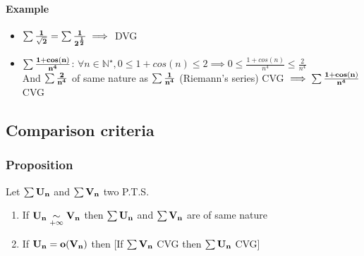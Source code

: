 \documentclass[notitlepage]{math}
\begin{document}
\paragraph{Example}
\begin{itemize}
    \item $\bf \sum \frac{1}{\sqrt{2}} = \sum \frac{1}{2^{\frac{1}{2}}} \implies$ DVG 
    \item $\bf \sum \frac{1 + cos(n)}{n^4}$: $\forall n \in \mathbb{N}^\star, 0 \leq 1 + cos(n) \leq 2 \implies 0 \leq \frac{1 + cos(n)}{n^4} \leq \frac{2}{n^4}$\\
    And $\bf \sum \frac{2}{n^4}$ of same nature as $\bf \sum \frac{1}{n^4}$ (Riemann's series) CVG $\implies \bf \sum \frac{1 + cos(n)}{n^4}$ CVG
\end{itemize}
\subsection{Comparison criteria}
\subsubsection{Proposition}
Let $\bf \sum U_n$ and $\bf \sum V_n$ two P.T.S.
\begin{enumerate}[label=\protect\circled{\arabic*}]
    \item If $\bf U_n \underset{+\infty}{\sim} V_n$ then $\bf \sum U_n$ and $\bf \sum V_n$ are of same nature\\
    \item If $\bf U_n = o(V_n)$ then [If $\bf \sum V_n$ CVG then $\bf \sum U_n$ CVG]
\end{enumerate}
\end{document}
